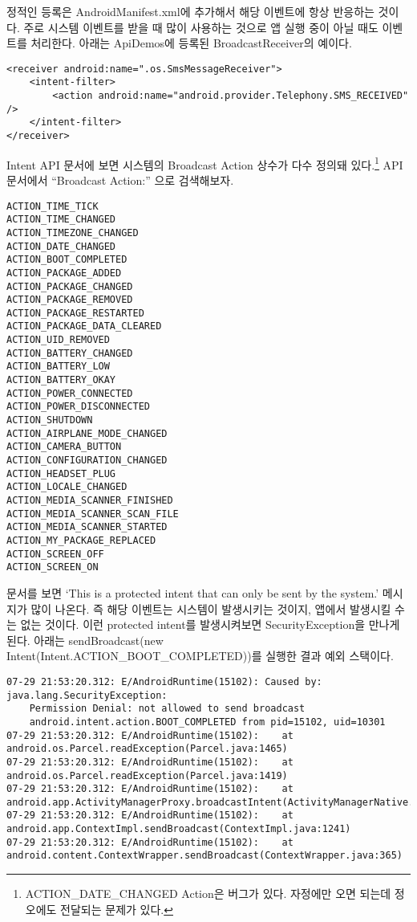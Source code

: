 정적인 등록은 AndroidManifest.xml에 추가해서 해당 이벤트에 항상 반응하는 것이다. 주로 시스템 이벤트를 받을 때 많이 사용하는 것으로 앱 실행 중이 아닐 때도 이벤트를 처리한다.
아래는 ApiDemos에 등록된 BroadcastReceiver의 예이다.
\begin{lstlisting}[frame=single] 
<receiver android:name=".os.SmsMessageReceiver">
	<intent-filter>
		<action android:name="android.provider.Telephony.SMS_RECEIVED" />
	</intent-filter>
</receiver>
\end{lstlisting}

Intent API 문서에 보면 시스템의 Broadcast Action 상수가 다수 정의돼 있다.\footnote{ACTION\_DATE\_CHANGED Action은 버그가 있다. 자정에만 오면 되는데 정오에도 전달되는 문제가 있다.
} 
API 문서에서 ``Broadcast Action:'' 으로 검색해보자.

\begin{verbatim}
ACTION_TIME_TICK
ACTION_TIME_CHANGED
ACTION_TIMEZONE_CHANGED
ACTION_DATE_CHANGED
ACTION_BOOT_COMPLETED
ACTION_PACKAGE_ADDED
ACTION_PACKAGE_CHANGED
ACTION_PACKAGE_REMOVED
ACTION_PACKAGE_RESTARTED
ACTION_PACKAGE_DATA_CLEARED
ACTION_UID_REMOVED
ACTION_BATTERY_CHANGED
ACTION_BATTERY_LOW
ACTION_BATTERY_OKAY
ACTION_POWER_CONNECTED
ACTION_POWER_DISCONNECTED
ACTION_SHUTDOWN
ACTION_AIRPLANE_MODE_CHANGED
ACTION_CAMERA_BUTTON
ACTION_CONFIGURATION_CHANGED
ACTION_HEADSET_PLUG
ACTION_LOCALE_CHANGED
ACTION_MEDIA_SCANNER_FINISHED
ACTION_MEDIA_SCANNER_SCAN_FILE
ACTION_MEDIA_SCANNER_STARTED
ACTION_MY_PACKAGE_REPLACED
ACTION_SCREEN_OFF
ACTION_SCREEN_ON
\end{verbatim}

문서를 보면 `This is a protected intent that can only be sent by the system.' 메시지가 많이 나온다. 
즉 해당 이벤트는 시스템이 발생시키는 것이지, 앱에서 발생시킬 수는 없는 것이다.
이런 protected intent를 발생시켜보면 SecurityException을 만나게 된다. 아래는 
sendBroadcast(new Intent(Intent.ACTION\_BOOT\_COMPL\-ETED))를 실행한 결과 예외 스택이다.
\begin{lstlisting}[frame=single] 
07-29 21:53:20.312: E/AndroidRuntime(15102): Caused by: java.lang.SecurityException:
	Permission Denial: not allowed to send broadcast
	android.intent.action.BOOT_COMPLETED from pid=15102, uid=10301
07-29 21:53:20.312: E/AndroidRuntime(15102): 	at android.os.Parcel.readException(Parcel.java:1465)
07-29 21:53:20.312: E/AndroidRuntime(15102): 	at android.os.Parcel.readException(Parcel.java:1419)
07-29 21:53:20.312: E/AndroidRuntime(15102): 	at android.app.ActivityManagerProxy.broadcastIntent(ActivityManagerNative.java:2430)
07-29 21:53:20.312: E/AndroidRuntime(15102): 	at android.app.ContextImpl.sendBroadcast(ContextImpl.java:1241)
07-29 21:53:20.312: E/AndroidRuntime(15102): 	at android.content.ContextWrapper.sendBroadcast(ContextWrapper.java:365)
\end{lstlisting}


